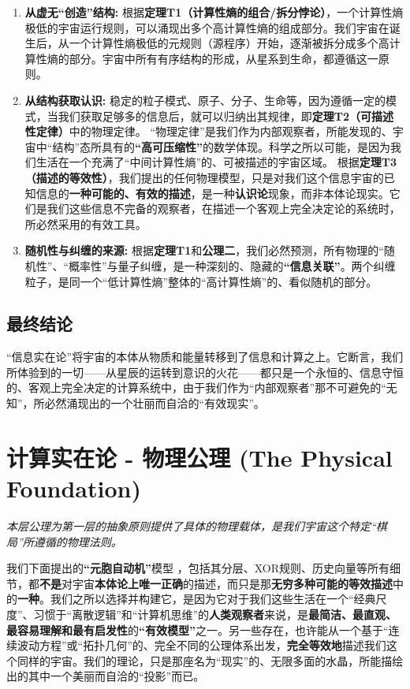 \documentclass[11pt, a4paper]{article}
\begin{document}
\begin{enumerate}
    \item \textbf{从虚无“创造”结构:}
    根据\textbf{定理T1（计算性熵的组合/拆分悖论）}，一个计算性熵极低的宇宙运行规则，可以涌现出多个高计算性熵的组成部分。我们宇宙在诞生后，从一个计算性熵极低的元规则（源程序）开始，逐渐被拆分成多个高计算性熵的部分。宇宙中所有有序结构的形成，从星系到生命，都遵循这一原则。

    \item \textbf{从结构获取认识:}
    稳定的粒子模式、原子、分子、生命等，因为遵循一定的模式，当我们获取足够多的信息后，就可以归纳出其规律，即\textbf{定理T2（可描述性定律）}中的物理定律。
    “物理定律”是我们作为内部观察者，所能发现的、宇宙中“结构”态所具有的\textbf{“高可压缩性”}的数学体现。科学之所以可能，是因为我们生活在一个充满了“中间计算性熵”的、可被描述的宇宙区域。
    根据\textbf{定理T3（描述的等效性）}，我们提出的任何物理模型，只是对我们这个信息宇宙的已知信息的\textbf{一种可能的、有效的描述}，是一种\textbf{认识论}现象，而非本体论现实。它们是我们这些信息不完备的观察者，在描述一个客观上完全决定论的系统时，所必然采用的有效工具。

    \item \textbf{随机性与纠缠的来源:}
    根据\textbf{定理T1}和\textbf{公理二}，我们必然预测，所有物理的“随机性”、“概率性”与量子纠缠，是一种深刻的、隐藏的\textbf{“信息关联”}。两个纠缠粒子，是同一个“低计算性熵”整体的“高计算性熵”的、看似随机的部分。
\end{enumerate}

\subsection*{最终结论}
“信息实在论”将宇宙的本体从物质和能量转移到了信息和计算之上。它断言，我们所体验到的一切——从星辰的运转到意识的火花——都只是一个永恒的、信息守恒的、客观上完全决定的计算系统中，由于我们作为“内部观察者”那不可避免的“无知”，所必然涌现出的一个壮丽而自洽的“有效现实”。

\section{计算实在论 - 物理公理 (The Physical Foundation)}
\textit{本层公理为第一层的抽象原则提供了具体的物理载体，是我们宇宙这个特定“棋局”所遵循的物理法则。}

我们下面提出的\textbf{“元胞自动机”}模型 \cite{Wolfram2002}，包括其分层、XOR规则、历史向量等所有细节，都\textbf{不是}对宇宙\textbf{本体论上唯一正确}的描述，而只是那\textbf{无穷多种可能的等效描述}中的\textbf{一种}。我们之所以选择并构建它，是因为它对于我们这些生活在一个“经典尺度”、习惯于“离散逻辑”和“计算机思维”的\textbf{人类观察者}来说，是\textbf{最简洁、最直观、最容易理解和最有启发性}的\textbf{“有效模型”}之一。另一些存在，也许能从一个基于“连续波动方程”或“拓扑几何”的、完全不同的公理体系出发，\textbf{完全等效地}描述我们这个同样的宇宙。我们的理论，只是那座名为“现实”的、无限多面的水晶，所能描绘出的其中一个美丽而自洽的“投影”而已。
\end{document}
